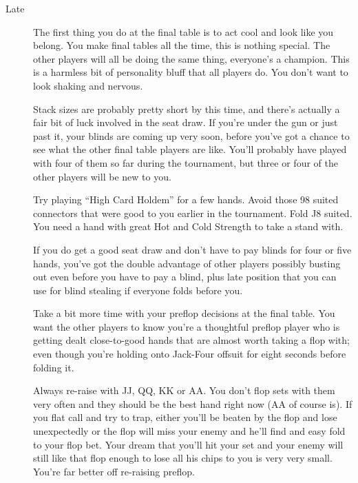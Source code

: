 \begin{description}
\item[Late] The first thing you do at the final table is to act cool
and look like you belong. You make final tables all the time, this is
nothing special. The other players will all be doing the same
thing, everyone's a champion. This is a harmless bit of personality
bluff that all players do. You don't want to look shaking and
nervous.

Stack sizes are probably pretty short by this time, and there's
actually a fair bit of luck involved in the seat draw. If you're under
the gun or just past it, your blinds are coming up very soon, before
you've got a chance to see what the other final table players are
like. You'll probably have played with four of them so far during the
tournament, but three or four of the other players will be new to
you.

Try playing ``High Card Holdem'' for a few hands. Avoid those 98
suited connectors that were good to you earlier in the
tournament. Fold J8 suited. You need a hand with great Hot and Cold
Strength to take a stand with.

If you do get a good seat draw and don't have to pay blinds for four
or five hands, you've got the double advantage of other players
possibly busting out even before you have to pay a blind, plus late
position that you can use for blind stealing if everyone folds before
you.

Take a bit more time with your preflop decisions at the final
table. You want the other players to know you're a thoughtful preflop
player who is getting dealt close-to-good hands that are almost worth
taking a flop with; even though you're holding onto Jack-Four offsuit
for eight seconds before folding it.

Always re-raise with JJ, QQ, KK or AA. You don't flop sets with them
very often and they should be the best hand right now (AA of course
is). If you flat call and try to trap, either you'll be beaten by the
flop and lose unexpectedly or the flop will miss your enemy and he'll
find and easy fold to your flop bet. Your dream that you'll hit your
set and your enemy will still like that flop enough to lose all his
chips to you is very very small. You're far better off re-raising
preflop.

\end{description}
